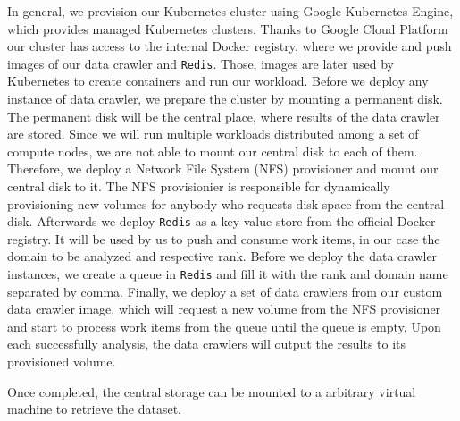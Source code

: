 In general, we provision our Kubernetes cluster using Google Kubernetes Engine, which provides managed Kubernetes clusters. Thanks to Google Cloud Platform our cluster has access to the internal Docker registry, where we provide and push images of our data crawler and \texttt{Redis}. Those, images are later used by Kubernetes to create containers and run our workload. Before we deploy any instance of data crawler, we prepare the cluster by mounting a permanent disk. The permanent disk will be the central place, where results of the data crawler are stored. Since we will run multiple workloads distributed among a set of compute nodes, we are not able to mount our central disk to each of them. Therefore, we deploy a Network File System (NFS) provisioner and mount our central disk to it. The NFS provisionier is responsible for dynamically provisioning new volumes for anybody who requests disk space from the central disk. Afterwards we deploy \texttt{Redis} as a key-value store from the official Docker registry. It will be used by us to push and consume work items, in our case the domain to be analyzed and respective rank. Before we deploy the data crawler instances, we create a queue in \texttt{Redis} and fill it with the rank and domain name separated by comma. Finally, we deploy a set of data crawlers from our custom data crawler image, which will request a new volume from the NFS provisioner and start to process work items from the queue until the queue is empty. Upon each successfully analysis, the data crawlers will output the results to its provisioned volume.

Once completed, the central storage can be mounted to a arbitrary virtual machine to retrieve the dataset. 

